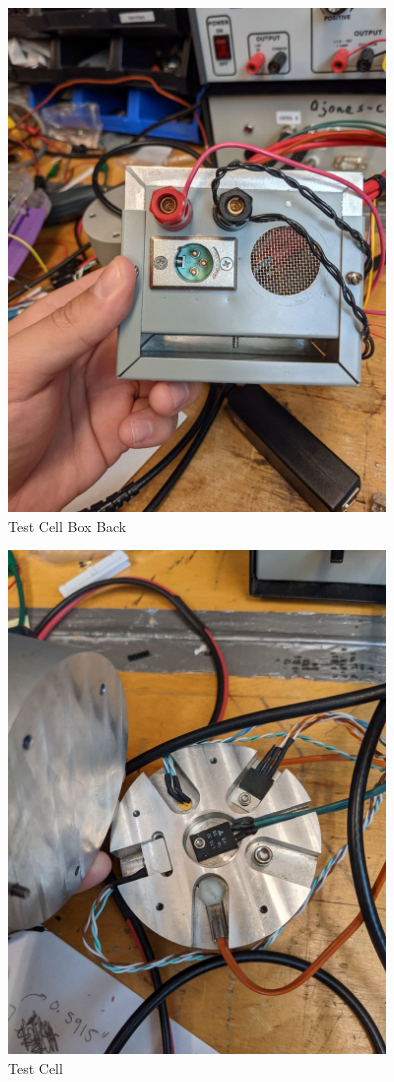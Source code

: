 \documentclass[11pt, letterpaper]{article}
\begin{document}
\begin{figure}[H]
    \centering
    \includegraphics[width=10cm]{testCellBoxBack.jpg}
    \caption{ Test Cell Box Back }
    \label{fig:testCellBoxBack}
\end{figure}

\begin{figure}[H]
    \centering
    \includegraphics[width=10cm]{testCellSetup.jpg}
    \caption{ Test Cell }
    \label{fig:testCellSetup}
\end{figure}
\end{document}
